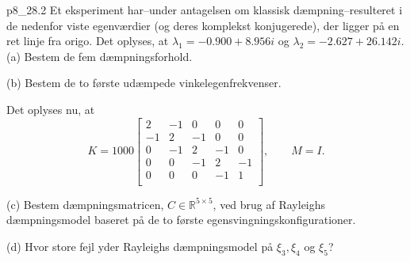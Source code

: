 \begin{problemwithimage}{p8_2}{8.2}
  Et eksperiment har--under antagelsen om klassisk dæmpning--resulteret i de nedenfor viste egenværdier (og deres komplekst konjugerede), der ligger på en ret linje fra origo.
  Det oplyses, at $\lambda_1 = \num{-0,900} + \num{8,956}i $ og $\lambda_2 = \num{-2,627} + \num{26,142} i$.
  (a) Bestem de fem dæmpningsforhold.

  (b) Bestem de to første udæmpede vinkelegenfrekvenser.

  Det oplyses nu, at
  \[ 
  K = \num{1000} \begin{bmatrix}
  2 & -1 & 0 & 0 & 0\\
  -1 & 2 & -1 & 0 & 0\\
  0 & -1 & 2 & -1 & 0\\
  0 & 0 & -1 & 2 & -1\\
  0 & 0 & 0 & -1 & 1\\
  \end{bmatrix}, \qquad M = I
  .\]
  
  (c) Bestem dæmpningsmatricen, $C \in \mathbb{R}^{5 \times 5}$, ved brug af Rayleighs dæmpningsmodel baseret på de to første egensvingningskonfigurationer.

  (d) Hvor store fejl yder Rayleighs dæmpningsmodel på $\xi_3, \xi_4$ og $\xi_5$?
\end{problemwithimage}

